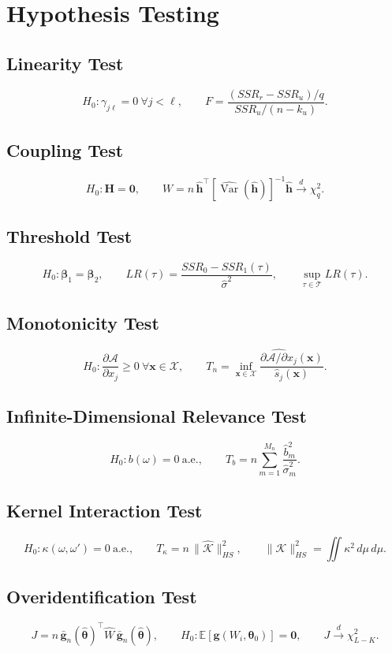 \documentclass[11pt]{article}
\begin{document}
\section{Hypothesis Testing}

\subsection{Linearity Test}
\[
H_0:\gamma_{j\ell}=0\ \forall j<\ell,
\qquad F=\frac{(SSR_r-SSR_u)/q}{SSR_u/(n-k_u)}.
\]

\subsection{Coupling Test}
\[
H_0:\bm{H}=\bm{0},
\qquad W=n\,\hat{\bm{h}}^\top\left[\widehat{\operatorname{Var}}(\hat{\bm{h}})\right]^{-1}\hat{\bm{h}}\xrightarrow{d}\chi_q^2.
\]

\subsection{Threshold Test}
\[
H_0:\bm{\beta}_1=\bm{\beta}_2,
\qquad LR(\tau)=\frac{SSR_0-SSR_1(\tau)}{\hat\sigma^2},
\qquad \sup_{\tau\in\mathcal{T}}LR(\tau).
\]

\subsection{Monotonicity Test}
\[
H_0:\frac{\partial\mathcal{A}}{\partial x_j}\ge 0\ \forall \bm{x}\in\mathcal{X},
\qquad T_n=\inf_{\bm{x}\in\mathcal{X}}\frac{\widehat{\partial\mathcal{A}/\partial x_j}(\bm{x})}{\hat s_j(\bm{x})}.
\]

\subsection{Infinite-Dimensional Relevance Test}
\[
H_0:b(\omega)=0\ \text{a.e.},
\qquad T_b=n\sum_{m=1}^{M_n}\frac{\hat b_m^2}{\hat\sigma_m^2}.
\]

\subsection{Kernel Interaction Test}
\[
H_0:\kappa(\omega,\omega')=0\ \text{a.e.},
\qquad T_\kappa=n\,\|\hat{\mathcal{K}}\|_{HS}^2,
\qquad \|\mathcal{K}\|_{HS}^2=\iint \kappa^2\,d\mu\,d\mu.
\]

\subsection{Overidentification Test}
\[
J=n\,\bar{\bm{g}}_n(\hat{\bm{\theta}})^\top \hat W\,\bar{\bm{g}}_n(\hat{\bm{\theta}}),
\qquad H_0:\mathbb{E}[\bm{g}(W_i,\bm{\theta}_0)]=\bm{0},
\qquad J\xrightarrow{d}\chi^2_{L-K}.
\]
\end{document}
